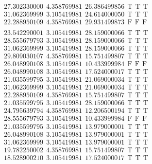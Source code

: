 \documentclass[10pt,a4paper]{article}
\begin{document}
\begin{itemize}
\begin{displaymath}
{\begin{aligned}
&27.302330000 ~~   4.358769981 ~~  26.386499856  ~~\mathrm{T  ~~ T  ~~ T } \\
&31.062369999 ~~   3.105419981 ~~  24.614000050  ~~\mathrm{T  ~~ T  ~~ T } \\
&22.288950109 ~~   4.358769981 ~~  29.931499873  ~~\mathrm{F  ~~ F  ~~  F} \\
				\end{aligned}
			}
		\end{displaymath}
		\begin{displaymath}
			\boxed{
				\begin{aligned}
&23.542290001 ~~   3.105419981 ~~  28.159000066  ~~\mathrm{T  ~~ T  ~~ T } \\
&28.555679793 ~~   3.105419981 ~~  28.159000066  ~~\mathrm{T  ~~ T  ~~ T } \\
&31.062369999 ~~   3.105419981 ~~  28.159000066  ~~\mathrm{T  ~~ T  ~~ T } \\
&29.809030107 ~~   4.358769981 ~~  15.751499807  ~~\mathrm{T  ~~ T  ~~ T } \\
&26.048990108 ~~   3.105419981 ~~  10.433999984  ~~\mathrm{F  ~~ F  ~~  F} \\
&26.048990108 ~~   3.105419981 ~~  17.524000017  ~~\mathrm{T  ~~ T  ~~ T } \\
&21.035599795 ~~   3.105419981 ~~  21.069000034  ~~\mathrm{T  ~~ T  ~~ T } \\
&31.062369999 ~~   3.105419981 ~~  21.069000034  ~~\mathrm{T  ~~ T  ~~ T } \\
&22.288950109 ~~   4.358769981 ~~  15.751499807  ~~\mathrm{T  ~~ T  ~~ T } \\
&21.035599795 ~~   3.105419981 ~~  28.159000066  ~~\mathrm{T  ~~ T  ~~ T } \\
&24.795639794 ~~   4.358769981 ~~  12.206500194  ~~\mathrm{T  ~~ T  ~~ T } \\
&28.555679793 ~~   3.105419981 ~~  10.433999984  ~~\mathrm{F  ~~ F  ~~  F} \\
&21.035599795 ~~   3.105419981 ~~  13.979000001  ~~\mathrm{T  ~~ T  ~~ T } \\
&26.048990108 ~~   3.105419981 ~~  13.979000001  ~~\mathrm{T  ~~ T  ~~ T } \\
&31.062369999 ~~   3.105419981 ~~  13.979000001  ~~\mathrm{T  ~~ T  ~~ T } \\
&19.782250002 ~~   4.358769981 ~~  15.751499807  ~~\mathrm{T  ~~ T  ~~ T } \\
&18.528900210 ~~   3.105419981 ~~  17.524000017  ~~\mathrm{T  ~~ T  ~~ T } \\

\end{aligned}}
\end{displaymath}
\end{itemize}
\end{document}
